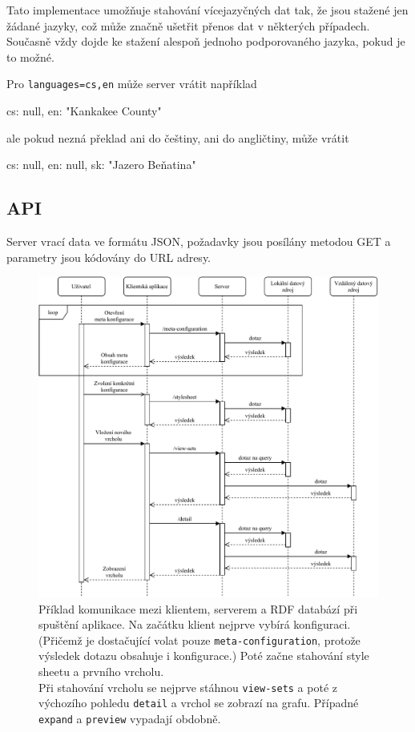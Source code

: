 Tato implementace umožňuje stahování vícejazyčných dat tak, že jsou stažené jen žádané jazyky, což může značně ušetřit přenos dat v některých případech. Současně vždy dojde ke stažení alespoň jednoho podporovaného jazyka, pokud je to možné.

\begin{prikl}
Pro \texttt{languages=cs,en} může server vrátit například
\begin{code}
{
    cs: null,
    en: "Kankakee County"
}
\end{code}
ale pokud nezná překlad ani do češtiny, ani do angličtiny, může vrátit
\begin{code}
{
    cs: null,
    en: null,
    sk: "Jazero Beňatina"
}
\end{code}
\end{prikl}

\subsection{API}
Server vrací data ve formátu JSON, požadavky jsou posílány metodou GET a parametry jsou kódovány do URL adresy.

\begin{figure}[p]
    \centering
    \includegraphics[width=\textwidth]{media/sequence-server.pdf}
    \caption{Příklad komunikace mezi klientem, serverem a RDF databází při spuštění aplikace. Na začátku klient nejprve vybírá konfiguraci. (Přičemž je dostačující volat pouze \texttt{meta-configuration}, protože výsledek dotazu obsahuje i konfigurace.) Poté začne stahování style sheetu a prvního vrcholu. \\ Při stahování vrcholu se nejprve stáhnou \texttt{view-sets} a poté z výchozího pohledu \texttt{detail} a vrchol se zobrazí na grafu. Případné \texttt{expand} a \texttt{preview} vypadají obdobně.}
\end{figure}

